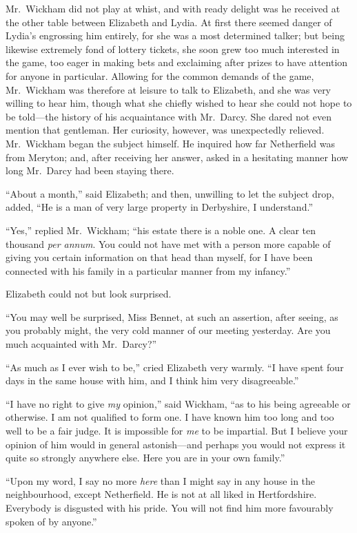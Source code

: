 \documentclass[12pt,english,oneside]{book}
\begin{document}
Mr.\ Wickham did not play at whist, and with ready delight was he
received at the other table between Elizabeth and Lydia. At first
there seemed danger of Lydia's engrossing him entirely, for she was
a most determined talker; but being likewise extremely fond of lottery
tickets, she soon grew too much interested in the game, too eager
in making bets and exclaiming after prizes to have attention for anyone
in particular. Allowing for the common demands of the game, Mr.\ Wickham
was therefore at leisure to talk to Elizabeth, and she was very willing
to hear him, though what she chiefly wished to hear she could not
hope to be told\mbox{---}the history of his acquaintance with Mr.\ Darcy.
She dared not even mention that gentleman. Her curiosity, however,
was unexpectedly relieved. Mr.\ Wickham began the subject himself.
He inquired how far Netherfield was from Meryton; and, after receiving
her answer, asked in a hesitating manner how long Mr.\ Darcy had
been staying there.

{}``About a month,'' said Elizabeth; and then, unwilling to let
the subject drop, added, {}``He is a man of very large property in
Derbyshire, I understand.''

{}``Yes,'' replied Mr.\ Wickham; {}``his estate there is a noble
one. A clear ten thousand \emph{per annum}. You could not have met
with a person more capable of giving you certain information on that
head than myself, for I have been connected with his family in a particular
manner from my infancy.''

Elizabeth could not but look surprised.

{}``You may well be surprised, Miss Bennet, at such an assertion,
after seeing, as you probably might, the very cold manner of our meeting
yesterday. Are you much acquainted with Mr.\ Darcy?''\ 

{}``As much as I ever wish to be,'' cried Elizabeth very warmly.
{}``I have spent four days in the same house with him, and I think
him very disagreeable.''

{}``I have no right to give \textit{my} opinion,'' said Wickham,
{}``as to his being agreeable or otherwise. I am not qualified to
form one. I have known him too long and too well to be a fair judge.
It is impossible for \textit{me} to be impartial. But I believe your
opinion of him would in general astonish\mbox{---}and perhaps you
would not express it quite so strongly anywhere else. Here you are
in your own family.''

{}``Upon my word, I say no more \textit{here} than I might say in
any house in the neighbourhood, except Netherfield. He is not at all
liked in Hertfordshire. Everybody is disgusted with his pride. You
will not find him more favourably spoken of by anyone.''
\end{document}
